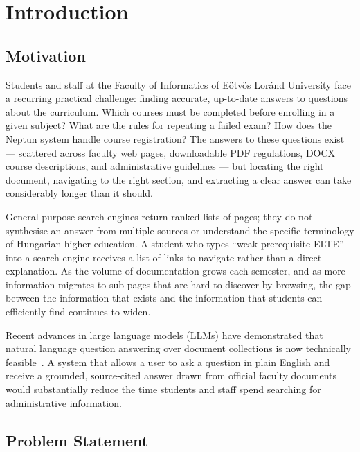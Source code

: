\chapter{Introduction}
\label{ch:intro}

\section{Motivation}
\label{sec:intro-motivation}

Students and staff at the Faculty of Informatics of Eötvös Loránd University face a recurring practical challenge: finding accurate, up-to-date answers to questions about the curriculum. Which courses must be completed before enrolling in a given subject? What are the rules for repeating a failed exam? How does the Neptun system handle course registration? The answers to these questions exist — scattered across faculty web pages, downloadable PDF regulations, DOCX course descriptions, and administrative guidelines — but locating the right document, navigating to the right section, and extracting a clear answer can take considerably longer than it should.

General-purpose search engines return ranked lists of pages; they do not synthesise an answer from multiple sources or understand the specific terminology of Hungarian higher education. A student who types ``weak prerequisite ELTE'' into a search engine receives a list of links to navigate rather than a direct explanation. As the volume of documentation grows each semester, and as more information migrates to sub-pages that are hard to discover by browsing, the gap between the information that exists and the information that students can efficiently find continues to widen.

Recent advances in large language models (LLMs) have demonstrated that natural language question answering over document collections is now technically feasible~\cite{lewis2020rag,brown2020gpt3}. A system that allows a user to ask a question in plain English and receive a grounded, source-cited answer drawn from official faculty documents would substantially reduce the time students and staff spend searching for administrative information.

\section{Problem Statement}
\label{sec:intro-problem}

